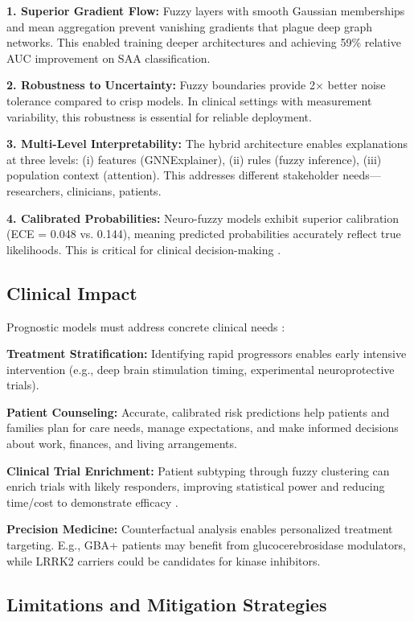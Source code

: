 \documentclass[conference]{IEEEtran}
\begin{document}
{{{\textbf{1. Superior Gradient Flow:} Fuzzy layers with smooth Gaussian memberships and mean aggregation prevent vanishing gradients that plague deep graph networks. This enabled training deeper architectures and achieving 59\% relative AUC improvement on SAA classification.

\textbf{2. Robustness to Uncertainty:} Fuzzy boundaries provide 2× better noise tolerance compared to crisp models. In clinical settings with measurement variability, this robustness is essential for reliable deployment.

\textbf{3. Multi-Level Interpretability:} The hybrid architecture enables explanations at three levels: (i) features (GNNExplainer), (ii) rules (fuzzy inference), (iii) population context (attention). This addresses different stakeholder needs---researchers, clinicians, patients.

\textbf{4. Calibrated Probabilities:} Neuro-fuzzy models exhibit superior calibration (ECE = 0.048 vs. 0.144), meaning predicted probabilities accurately reflect true likelihoods. This is critical for clinical decision-making \cite{guo2017calibration}.

\subsection{Clinical Impact}

Prognostic models must address concrete clinical needs \cite{moons2012risk}:

\textbf{Treatment Stratification:} Identifying rapid progressors enables early intensive intervention (e.g., deep brain stimulation timing, experimental neuroprotective trials).

\textbf{Patient Counseling:} Accurate, calibrated risk predictions help patients and families plan for care needs, manage expectations, and make informed decisions about work, finances, and living arrangements.

\textbf{Clinical Trial Enrichment:} Patient subtyping through fuzzy clustering can enrich trials with likely responders, improving statistical power and reducing time/cost to demonstrate efficacy \cite{fereshtehnejad2017clinical}.

\textbf{Precision Medicine:} Counterfactual analysis enables personalized treatment targeting. E.g., GBA+ patients may benefit from glucocerebrosidase modulators, while LRRK2 carriers could be candidates for kinase inhibitors.

\subsection{Limitations and Mitigation Strategies}

}}}
\end{document}
